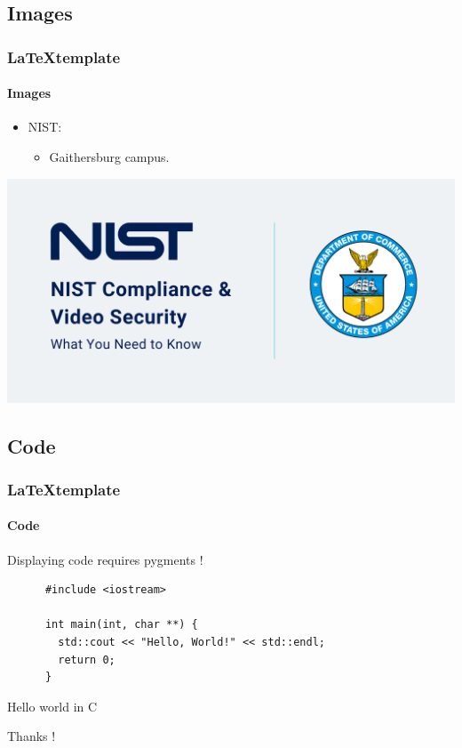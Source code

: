 \documentclass[aspectratio=169]{beamer}
\begin{document}
\subsection{Images}
\begin{frame}
  \frametitle{\LaTeX template}
  \framesubtitle{Images}

  \begin{minipage}[h!]{0.45\textwidth}
    \begin{itemize}
      \item NIST:
      \begin{itemize}
        \item Gaithersburg campus.
      \end{itemize}
    \end{itemize}
  \end{minipage}\hfill
  \begin{minipage}[h!]{0.45\textwidth}
    \includegraphics[scale=0.2]{./img/example-image.png}
  \end{minipage}
\end{frame}

\subsection{Code}
\begin{frame}[containsverbatim]
  \frametitle{\LaTeX template}
  \framesubtitle{Code}

  Displaying code requires pygments !

  \begin{listing}[H]
    \begin{verbatim}
      #include <iostream>

      int main(int, char **) {
        std::cout << "Hello, World!" << std::endl;
        return 0;
      }
    \end{verbatim}
    \caption{Hello world in C}
  \end{listing}

\end{frame}

\begin{frame}
  \centering
  \LARGE Thanks !
\end{frame}
\end{document}

